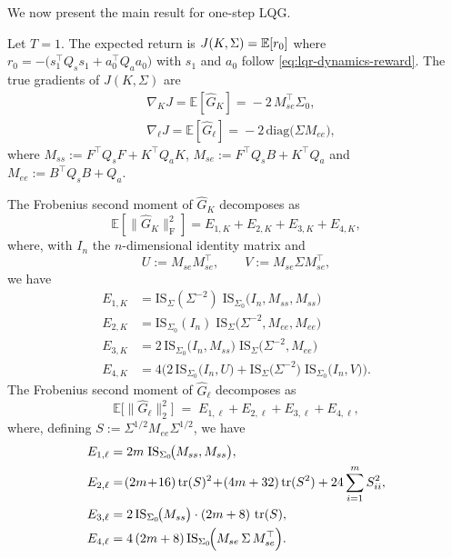 We now present the main result for one-step LQG.

\begin{theorem}
\label{thm:lqg-variance-one-step}
Let $T=1$. The expected return is $J(K,\Sigma) = {\mathbb{E}} [r_0]$ where $r_0 =-\big(s_1^\top Q_s s_1+a_0^\top Q_a a_0\big)$ with $s_1$ and $a_0$ follow \eqref{eq:lqr-dynamics-reward}. The true gradients of $J(K,\Sigma)$ are
\begin{align}
  &\nabla_K J = \mathbb E[\widehat G_K]\!=\!-2\,M_{se}^\top\Sigma_0, \\
  &\nabla_\ell J = \mathbb E[\widehat G_\ell]\!=\!-2\,\mathrm{diag}\big(\Sigma M_{ee}\big),
\end{align}
where $M_{ss}:=F^\top Q_sF+K^\top Q_a K$, $M_{se}:=F^\top Q_sB+K^\top Q_a$ and $M_{ee}:=B^\top Q_s B+Q_a$. 

The Frobenius second moment of $\widehat G_K$ decomposes as
\[
\mathbb E\!\left[\|\widehat G_K\|_{\mathrm F}^2\right]
= E_{1,K}+E_{2,K}+E_{3,K}+E_{4,K},
\]
where, with $I_n$ the $n$-dimensional identity matrix and
\[
U := M_{se}M_{se}^\top,\qquad
V := M_{se}\Sigma M_{se}^\top,
\]
we have
\begin{align*}
E_{1,K}
&= \mathrm{IS}_{\Sigma}(\Sigma^{-2})\;
    \mathrm{IS}_{\Sigma_0}\big(I_n, M_{ss}, M_{ss}\big)\\
E_{2,K}
&= \mathrm{IS}_{\Sigma_0}(I_n)\;
    \mathrm{IS}_{\Sigma}\big(\Sigma^{-2}, M_{ee}, M_{ee}\big)\\
E_{3,K}
&= 2\,
    \mathrm{IS}_{\Sigma_0}\big(I_n, M_{ss}\big)\;
    \mathrm{IS}_{\Sigma}\big(\Sigma^{-2}, M_{ee}\big)\\
E_{4,K}
&= 4\Big(
    2\,\mathrm{IS}_{\Sigma_0}\big(I_n,U\big)
    + \mathrm{IS}_{\Sigma}\big(\Sigma^{-2}\big)\;
      \mathrm{IS}_{\Sigma_0}\big(I_n,V\big)
    \Big).
\end{align*}
The Frobenius second moment of $\widehat G_\ell$ decomposes as
\[
  \mathbb E\big[\|\widehat G_\ell\|_2^2\big]
\;=\;E_{1,\ell} + E_{2,\ell} + E_{3,\ell} + E_{4,\ell},
\]
where, defining $S:=\Sigma^{1/2}M_{ee}\Sigma^{1/2}$, we have
    \begin{align*}
    E_{1,\ell}
    &=2m\;\mathrm{IS}_{\Sigma_0}\!\big( M_{ss}, M_{ss}\big),\\
    E_{2,\ell}
    &=\!(2m\!+\!16)\tr(S)^2\!+\!(4m+32)\tr(S^2) + 24 \sum_{i=1}^m S_{ii}^2,\\
    E_{3,\ell}
    &=2\,\mathrm{IS}_{\Sigma_0}\!\big( M_{ss}\big)\cdot (2m+8)\,\tr(S),\\
    E_{4,\ell}
    &=4\,(2m+8)\,\mathrm{IS}_{\Sigma_0}\!\Big(M_{se}\,\Sigma\,M_{se}^\top\Big).
    \end{align*}
\end{theorem}


